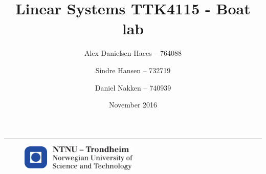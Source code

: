 \documentclass[a4paper]{article}
\title{Linear Systems TTK4115 - Boat lab}
\author{
  Alex Danielsen-Haces -- 764088 \and
  Sindre Hansen -- 732719 \and
  Daniel Nakken -- 740939}
\date{November 2016}
\begin{document}
\begin{titlepage}
    \maketitle
    \rule{\linewidth}{0.5mm}
    \begin{figure}
    \centering
    \includegraphics[width=0.5\textwidth]{images/logontnu_eng}
    \end{figure}
    \thispagestyle{empty}
\end{titlepage} 
\tableofcontents
\thispagestyle{empty} %
\newpage
\setcounter{page}{1}

\newpage

\newpage

\newpage

\newpage

\newpage
\clearpage

\newpage
\clearpage

\end{document}
